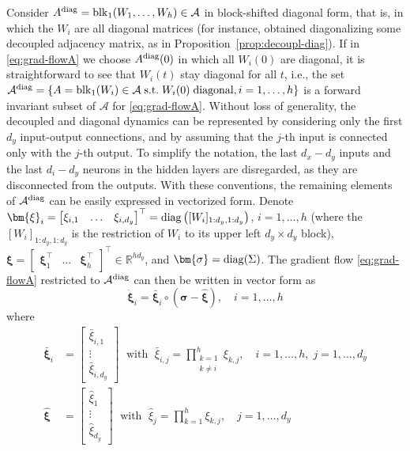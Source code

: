 \documentclass{article}
\def\diag{{\rm diag}}
\def\block{{\rm blk}}
\newcommand{\1}{\mathds{1}}
\newcommand{\beq}{\begin{equation}}
\newcommand{\eeq}{\end{equation}}
\begin{document}
Consider $A^{\diag}= \block_1(W_1, \ldots, W_h) \in  \mathcal{A} $ in block-shifted diagonal form, that is, in which the $ W_i $ are all diagonal matrices (for instance,  obtained diagonalizing some decoupled adjacency matrix, as in Proposition~\ref{prop:decoupl-diag}). If in \eqref{eq:grad-flowA} we choose $A^{\diag}(0) $ in which all $ W_i(0) $ are diagonal, it is straightforward to see that $ W_i(t)$ stay diagonal for all $t$, i.e., the set $ \mathcal{A}^{\diag} = \{ A= \block_1(W_i) \in  \mathcal{A} \; \text{s.t.}\; W_i(0) \; \text{diagonal}, i=1,\ldots, h \}$ is a forward invariant subset of $ \mathcal{A} $ for \eqref{eq:grad-flowA}.
Without loss of generality, the decoupled and diagonal dynamics can be represented by considering only the first $ d_y $ input-output connections, and by assuming that the $ j$-th input is connected only with the $j$-th output.
To simplify the notation, the last $ d_x - d_y $ inputs and the last $ d_i-d_y $ neurons in the hidden layers are disregarded, as they are disconnected from the outputs. 
With these conventions, the remaining elements of $ \mathcal{A}^{\diag} $ can be easily expressed in vectorized form. 
Denote $ \bm{\xi}_i =\begin{bmatrix}\xi_{i,1} & \ldots & \xi_{i,d_y} \end{bmatrix}^\top  = \diag\left( [W_i]_{1:d_y,1:d_y} \right)$, $i=1, \ldots, h$ (where the $ [W_i]_{1:d_y,1:d_y} $ is the restriction of $ W_i $ to its upper left $ d_y \times d_y $ block), $ \bm{\xi} = \begin{bmatrix}\bm{\xi}_{1}^\top & \ldots & \bm{\xi}_{h}^\top \end{bmatrix}^\top \in \mathbb{R}^{h d_y}$, and $ \bm{\sigma} =\diag(\Sigma)$.
The gradient flow \eqref{eq:grad-flowA} restricted to $ \mathcal{A}^{\diag} $ can then be written in vector form as 
\beq
\dot{\bm{\xi}}_i = \bar{\bm{\xi}}_i \circ (\bm{\sigma} - \hat{\bm{\xi}}) , \quad i=1, \ldots, h
\label{eq:grad-flow-xi}
\eeq
where
\begin{align*}
\bar{\bm{\xi}}_i & = \begin{bmatrix} \bar{\xi}_{i,1} \\ \vdots \\
\bar{\xi}_{i,d_y} 
\end{bmatrix}  \; \text{  with  } \; \bar{\xi}_{i,j} =\prod_{\substack{k=1 \\ k\neq i }}^h \xi_{k,j} , \quad 
i=1, \ldots, h, \; j=1 , \ldots, d_y 
\\
\hat{\bm{\xi}} & = \begin{bmatrix} \hat{\xi}_{1} \\ \vdots \\
\hat{\xi}_{d_y} 
\end{bmatrix}  \; \text{  with  } \; \hat{\xi}_{j} =\prod_{k=1 }^h \xi_{k,j} , \quad  j=1 , \ldots, d_y 
\end{align*}
\end{document}
